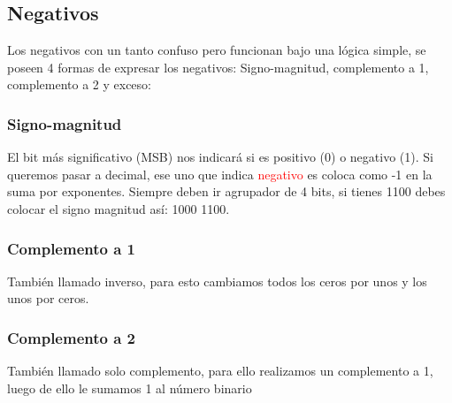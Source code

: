 \documentclass[
	12pt, %
	fleqn, %
	a4paper, %
]{LegrandOrangeBook}
\begin{document}
\subsection{Negativos}
Los negativos con un tanto confuso pero funcionan bajo una lógica simple, se poseen 4 formas de expresar los negativos: Signo-magnitud, complemento a 1, complemento a 2 y exceso:
\subsubsection{Signo-magnitud}
El bit más significativo (MSB) nos indicará si es positivo (0) o negativo (1). Si queremos pasar a decimal, ese uno que indica \textcolor{red}{negativo} es coloca como -1 en la suma por exponentes. Siempre deben ir agrupador de 4 bits, si tienes 1100 debes colocar el signo magnitud así: 1000 1100.
\subsubsection{Complemento a 1}
También llamado inverso, para esto cambiamos todos los ceros por unos y los unos por ceros.
\subsubsection{Complemento a 2}
También llamado solo complemento, para ello realizamos un complemento a 1, luego de ello le sumamos 1 al número binario
\end{document}
